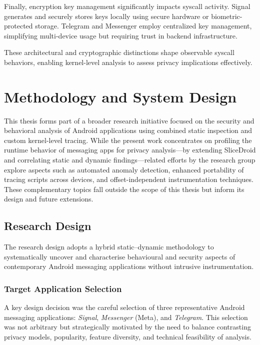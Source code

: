 \documentclass[a4paper,12pt]{report}
\begin{document}
Finally, encryption key management significantly impacts syscall activity. Signal generates and securely stores keys locally using secure hardware or biometric-protected storage. Telegram and Messenger employ centralized key management, simplifying multi-device usage but requiring trust in backend infrastructure.

These architectural and cryptographic distinctions shape observable syscall behaviors, enabling kernel-level analysis to assess privacy implications effectively.
\chapter{Methodology and System Design}

This thesis forms part of a broader research initiative focused on the security and behavioral analysis of Android applications using combined static inspection and custom kernel-level tracing. While the present work concentrates on profiling the runtime behavior of messaging apps for privacy analysis—by extending SliceDroid and correlating static and dynamic findings—related efforts by the research group explore aspects such as automated anomaly detection, enhanced portability of tracing scripts across devices, and offset-independent instrumentation techniques. These complementary topics fall outside the scope of this thesis but inform its design and future extensions.

\section{Research Design}

The research design adopts a hybrid static–dynamic methodology to systematically uncover and characterise behavioural and security aspects of contemporary Android messaging applications without intrusive instrumentation.

\subsection{Target Application Selection}

A key design decision was the careful selection of three representative Android messaging applications: \textit{Signal}, \textit{Messenger} (Meta), and \textit{Telegram}. This selection was not arbitrary but strategically motivated by the need to balance contrasting privacy models, popularity, feature diversity, and technical feasibility of analysis.
\end{document}
